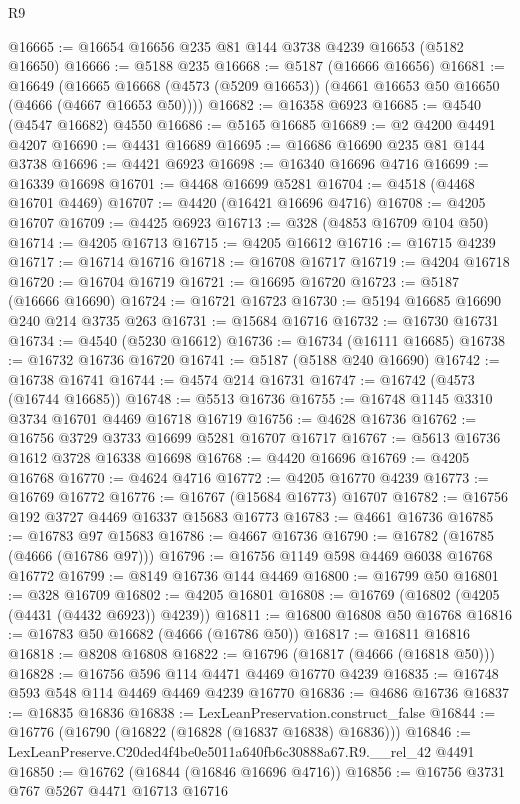 \begin{lexlean}{R9}
\begin{coremodule}
@16665 := @16654 @16656 @235 @81 @144 @3738 @4239 @16653 (@5182 @16650)
@16666 := @5188 @235
@16668 := @5187 (@16666 @16656)
@16681 := @16649
    (@16665 @16668 (@4573 (@5209 @16653)) (@4661 @16653 @50 @16650 (@4666 (@4667 @16653 @50))))
@16682 := @16358 @6923
@16685 := @4540 (@4547 @16682) @4550
@16686 := @5165 @16685
@16689 := @2 @4200 @4491 @4207
@16690 := @4431 @16689
@16695 := @16686 @16690 @235 @81 @144 @3738
@16696 := @4421 @6923
@16698 := @16340 @16696 @4716
@16699 := @16339 @16698
@16701 := @4468 @16699 @5281
@16704 := @4518 (@4468 @16701 @4469)
@16707 := @4420 (@16421 @16696 @4716)
@16708 := @4205 @16707
@16709 := @4425 @6923
@16713 := @328 (@4853 @16709 @104 @50)
@16714 := @4205 @16713
@16715 := @4205 @16612
@16716 := @16715 @4239
@16717 := @16714 @16716
@16718 := @16708 @16717
@16719 := @4204 @16718
@16720 := @16704 @16719
@16721 := @16695 @16720
@16723 := @5187 (@16666 @16690)
@16724 := @16721 @16723
@16730 := @5194 @16685 @16690 @240 @214 @3735 @263
@16731 := @15684 @16716
@16732 := @16730 @16731
@16734 := @4540 (@5230 @16612)
@16736 := @16734 (@16111 @16685)
@16738 := @16732 @16736 @16720
@16741 := @5187 (@5188 @240 @16690)
@16742 := @16738 @16741
@16744 := @4574 @214 @16731
@16747 := @16742 (@4573 (@16744 @16685))
@16748 := @5513 @16736
@16755 := @16748 @1145 @3310 @3734 @16701 @4469 @16718 @16719
@16756 := @4628 @16736
@16762 := @16756 @3729 @3733 @16699 @5281 @16707 @16717
@16767 := @5613 @16736 @1612 @3728 @16338 @16698
@16768 := @4420 @16696
@16769 := @4205 @16768
@16770 := @4624 @4716
@16772 := @4205 @16770 @4239
@16773 := @16769 @16772
@16776 := @16767 (@15684 @16773) @16707
@16782 := @16756 @192 @3727 @4469 @16337 @15683 @16773
@16783 := @4661 @16736
@16785 := @16783 @97 @15683
@16786 := @4667 @16736
@16790 := @16782 (@16785 (@4666 (@16786 @97)))
@16796 := @16756 @1149 @598 @4469 @6038 @16768 @16772
@16799 := @8149 @16736 @144 @4469
@16800 := @16799 @50
@16801 := @328 @16709
@16802 := @4205 @16801
@16808 := @16769 (@16802 (@4205 (@4431 (@4432 @6923)) @4239))
@16811 := @16800 @16808 @50 @16768
@16816 := @16783 @50 @16682 (@4666 (@16786 @50))
@16817 := @16811 @16816
@16818 := @8208 @16808
@16822 := @16796 (@16817 (@4666 (@16818 @50)))
@16828 := @16756 @596 @114 @4471 @4469 @16770 @4239
@16835 := @16748 @593 @548 @114 @4469 @4469 @4239 @16770
@16836 := @4686 @16736
@16837 := @16835 @16836
@16838 := LexLeanPreservation.construct_false
@16844 := @16776 (@16790 (@16822 (@16828 (@16837 @16838) @16836)))
@16846 := LexLeanPreserve.C20ded4f4be0e5011a640fb6c30888a67.R9.__rel_42 @4491
@16850 := @16762 (@16844 (@16846 @16696 @4716))
@16856 := @16756 @3731 @767 @5267 @4471 @16713 @16716

\end{coremodule}
\end{lexlean}
